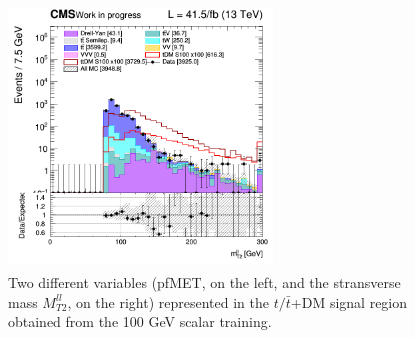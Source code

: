 \documentclass[a4paper, 10pt, openright]{report}
\begin{document}
\begin{figure}[htbp]
{\begin{minipage}[b]{.48\textwidth}
\end{minipage}\hfill
\begin{minipage}[b]{.48\textwidth}
\includegraphics[width=7cm, height=7cm]{figs/2017/SmearSR-ttDM-scalar100/log_cratio_ST_topCR_ll_BDT_ttDM100_mt2ll.png}
\end{minipage} \hfill
}
\caption{Two different variables (pf\ac{MET}, on the left, and the stransverse mass $M_{T2}^{ll}$, on the right) represented in the $t /\bar t$+DM signal region obtained from the 100 GeV scalar training.}
\label{fig:SR1}
\end{figure}
\end{document}
